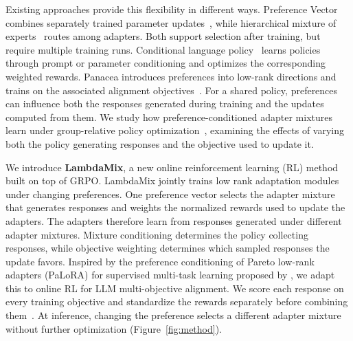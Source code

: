 \documentclass{article} %
\begin{document}
Existing approaches provide this flexibility in different ways. Preference Vector combines separately trained parameter updates~\citep{prefvector2026}, while hierarchical mixture of experts~\citep[HoE]{li2026hoe} routes among adapters. Both support selection after training, but require multiple training runs. Conditional language policy~\citep[CLP]{wang-etal-2024-conditional} learns policies through prompt or parameter conditioning and optimizes the corresponding weighted rewards. Panacea introduces preferences into low-rank directions and trains on the associated alignment objectives~\citep{zhong2024panacea}. For a shared policy, preferences can influence both the responses generated during training and the updates computed from them. We study how preference-conditioned adapter mixtures learn under group-relative policy optimization~\citep[GRPO]{shao2024deepseekmath}, examining the effects of varying both the policy generating responses and the objective used to update it.

We introduce \textbf{LambdaMix}, a new online reinforcement learning (RL) method built on top of GRPO. LambdaMix jointly trains low rank adaptation modules~\citep[LoRA]{hu2022lora} under changing preferences. One preference vector selects the adapter mixture that generates responses and weights the normalized rewards used to update the adapters. The adapters therefore learn from responses generated under different adapter mixtures. Mixture conditioning determines the policy collecting responses, while objective weighting determines which sampled responses the update favors. Inspired by the preference conditioning of Pareto low-rank adapters (PaLoRA) for supervised multi-task learning proposed by \citet{dimitriadis2025palora}, we adapt this to online RL for LLM multi-objective alignment. We score each response on every training objective and standardize the rewards separately before combining them~\citep{liu2026gdpo}. At inference, changing the preference selects a different adapter mixture without further optimization (Figure~\ref{fig:method}).
\end{document}
